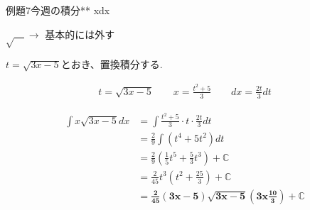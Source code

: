 \documentclass[main]{subfiles}
\begin{document}
\begin{newmondai}{例題}{7}{今週の積分}{**}
    \int xdx
\end{newmondai}
\begin{approachbox}
$\sqrt{\quad}\rightarrow$  基本的には外す
\end{approachbox}

\solutionhead
\hfill
$t=\sqrt{3x-5}$とおき、置換積分する.\hfill\ 
\begin{itembox}
    \begin{align*}
        t=\sqrt{3x-5} \qquad x=\frac{t^2+5}{3} \qquad dx=\frac{2t}{3}dt
    \end{align*}
\end{itembox}
\begin{align*}
    \int x\sqrt{3x-5}dx
        &= \int\frac{t^2+5}{3}\cdot t\cdot \frac{2t}{3}dt \\
        &= \frac{2}{9}\int\left(t^4+5t^2\right)dt \\
        &= \frac{2}{9}\left(\frac{1}{5}t^5+\frac{5}{3}t^3\right)+\mathbb{C} \\
        &= \frac{2}{45}t^3\left(t^2+\frac{25}{3}\right)+\mathbb{C} \\
        &= \boldsymbol{\frac{2}{45}\left(3x-5\right)\sqrt{3x-5}\left(3x\frac{10}{3}\right)+\mathbb{C}}
\end{align*}
\end{document}

